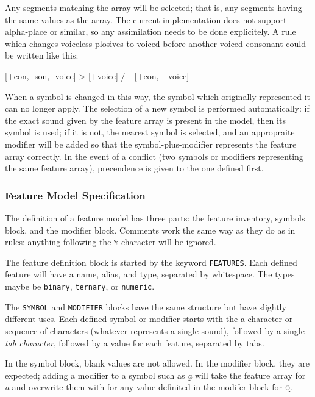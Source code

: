 \documentclass[10pt,letterpaper]{article}
\newcounter{excounter}
\newenvironment{vex}[1]{
	\vspace{1em}
	\refstepcounter{excounter}
	\noindent\makebox[3em][l]{(\arabic{excounter}\label{#1})}
	\minipage{\textwidth}
	\verbatim
}{
	\endverbatim
	\endminipage
	\vspace{1em}
}
\begin{document}
\noindent
Any segments matching the array will be selected; that is, any segments having the same values as the array. The current implementation does not support alpha-place or similar, so any assimilation needs to be done explicitely. A rule which changes voiceless plosives to voiced before another voiced consonant could be written like this:

\begin{vex}{ex:voicing_assimilation}
[+con, -son, -voice] > [+voice] / _[+con, +voice]
\end{vex}

When a symbol is changed in this way, the symbol which originally represented it can no longer apply. The selection of a new symbol is performed automatically: if the exact sound given by the feature array is present in the model, then its symbol is used; if it is not, the nearest symbol is selected, and an appropraite modifier will be added so that the symbol-plus-modifier represents the feature array correctly. In the event of a conflict (two symbols or modifiers representing the same feature array), precendence is given to the one defined first.

\subsubsection{Feature Model Specification}
\label{ssub:feature_model_specification}
The definition of a feature model has three parts: the feature inventory, symbols block, and the modifier block. Comments work the same way as they do as in rules: anything following the \texttt{\%} character will be ignored.

The feature definition block is started by the keyword \texttt{FEATURES}. Each defined feature will have a name, alias, and type, separated by whitespace. The types maybe be \texttt{binary}, \texttt{ternary}, or \texttt{numeric}. 

The \texttt{SYMBOL} and \texttt{MODIFIER} blocks have the same structure but have slightly different uses. Each defined symbol or modifier starts with the a character or sequence of characters (whatever represents a single sound), followed by a single \emph{tab character}, followed by a value for each feature, separated by tabs.

In the symbol block, blank values are not allowed. In the modifier block, they are expected; adding a modifier to a symbol such as \emph{a̰} will take the feature array for \emph{a} and overwrite them with for any value definited in the modifer block for \emph{◌̰}.
\end{document}
